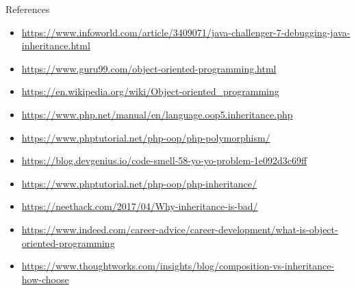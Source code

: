 \begin{sepframe}{References}{}
\end{sepframe}

\begin{frame}
    \begin{itemize}
        \item \url{https://www.infoworld.com/article/3409071/java-challenger-7-debugging-java-inheritance.html}
        \item \url{https://www.guru99.com/object-oriented-programming.html}
        \item \url{https://en.wikipedia.org/wiki/Object-oriented_programming}
        \item \url{https://www.php.net/manual/en/language.oop5.inheritance.php}
        \item \url{https://www.phptutorial.net/php-oop/php-polymorphism/}
        \item \url{https://blog.devgenius.io/code-smell-58-yo-yo-problem-1e092d3c69ff}
        \item \url{https://www.phptutorial.net/php-oop/php-inheritance/}
        \item \url{https://neethack.com/2017/04/Why-inheritance-is-bad/}
        \item \url{https://www.indeed.com/career-advice/career-development/what-is-object-oriented-programming}
        \item \url{https://www.thoughtworks.com/insights/blog/composition-vs-inheritance-how-choose}
    \end{itemize}
\end{frame}
